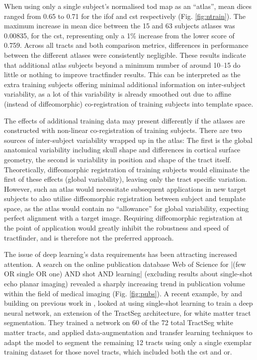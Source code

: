 When using only a single subject's normalised \gls{tod} map as an ``atlas'', mean \glspl{dice} ranged from 0.65 to 0.71 for the \gls{ifof} and \gls{cst} respectively (Fig. \ref{fig:ntrain}).
The maximum increase in mean \gls{dice} between the 15 and 63 subjects atlases was 0.00835, for the \gls{cst}, representing only a 1\% increase from the lower score of 0.759.
Across all tracts and both comparison metrics, differences in performance between the different atlases were consistently negligible.
These results indicate that additional atlas subjects beyond a minimum number of around 10--15 do little or nothing to improve tractfinder results.
This can be interpreted as the extra training subjects offering minimal additional information on inter-subject variability, as a lot of this variability is already smoothed out due to affine (instead of diffeomorphic) co-registration of training subjects into template space.

The effects of additional training data may present differently if the atlases are constructed with non-linear co-registration of training subjects. %
There are two sources of inter-subject variability wrapped up in the atlas:
The first is the global anatomical variability including skull shape and differences in cortical surface geometry, the second is variability in position and shape of the tract itself.
Theoretically, diffeomorphic registration of training subjects would eliminate the first of these effects (global variability), leaving only the tract specific variation.
However, such an atlas would necessitate subsequent applications in new target subjects to also utilise diffeomorphic registration between subject and template space, as the atlas would contain no ``allowance'' for global variability, expecting perfect alignment with a target image.
Requiring diffeomorphic registration at the point of application would greatly inhibit the robustness and speed of tractfinder, and is therefore not the preferred approach.

The issue of deep learning's data requirements has been attracting increased attention.
A search on the online publication database Web of Science for \spverb|(few OR single OR one) AND shot AND learning|  (excluding results about single-shot echo planar imaging) revealed a sharply increasing trend in publication volume within the field of medical imaging (Fig. \ref{fig:pubs}).
A recent example, by \textcite{Liu2023a} and building on previous work in \textcite{Lu2021}, looked at using single-shot learning to train a deep neural network, an extension of the TractSeg architecture, for white matter tract segmentation.
They trained a network on 60 of the 72 total TractSeg white matter tracts, and applied data-augmentation and transfer learning techniques to adapt the model to segment the remaining 12 tracts using only a single exemplar training dataset for those novel tracts, which included both the \gls{cst} and \gls{or}.

